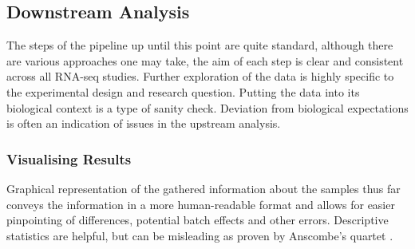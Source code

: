 \subsection{Downstream Analysis}
The steps of the pipeline up until this point are quite standard, although there are various approaches one may take, the aim of each step is clear and consistent across all RNA-seq studies. Further exploration of the data is highly specific to the experimental design and research question. Putting the data into its biological context is a type of sanity check. Deviation from biological expectations is often an indication of issues in the upstream analysis.

\subsubsection{Visualising Results}

Graphical representation of the gathered information about the samples thus far conveys the information in a more human-readable format and allows for easier pinpointing of differences, potential batch effects and other
errors. Descriptive statistics are helpful, but can be misleading as proven by Anscombe's quartet \citep{anscombe1973graphs}.

